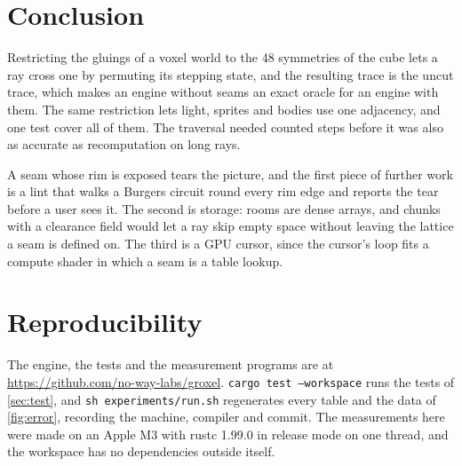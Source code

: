 \documentclass[10pt,a4paper]{article}
\newcommand{\code}[1]{\texttt{#1}}
\begin{document}
\section{Conclusion}

Restricting the gluings of a voxel world to the 48 symmetries of the cube lets a ray cross one
by permuting its stepping state, and the resulting trace is the uncut trace, which makes an
engine without seams an exact oracle for an engine with them. The same restriction lets light,
sprites and bodies use one adjacency, and one test cover all of them. The traversal needed
counted steps before it was also as accurate as recomputation on long rays.

A seam whose rim is exposed tears the picture, and the first piece of further work is a lint
that walks a Burgers circuit round every rim edge and reports the tear before a user sees it.
The second is storage: rooms are dense arrays, and chunks with a clearance field would let a ray
skip empty space without leaving the lattice a seam is defined on. The third is a GPU cursor,
since the cursor's loop fits a compute shader in which a seam is a table lookup.

\section*{Reproducibility}

The engine, the tests and the measurement programs are at
\url{https://github.com/no-way-labs/groxel}. \code{cargo test --workspace} runs the tests of
\cref{sec:test}, and \code{sh experiments/run.sh} regenerates every table and the data of
\cref{fig:error}, recording the machine, compiler and commit. The measurements here were made on
an Apple M3 with rustc 1.99.0 in release mode on one thread, and the workspace has no
dependencies outside itself.



\end{document}

